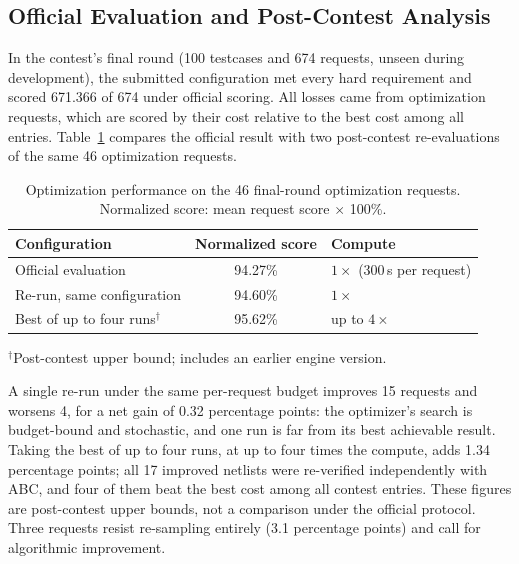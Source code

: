 \documentclass[conference,letterpaper]{IEEEtran}
\begin{document}
\subsection{Official Evaluation and Post-Contest Analysis}
\label{sec:official}

In the contest's final round (100 testcases and 674 requests, unseen during
development), the submitted configuration met every hard requirement and
scored 671.366 of 674 under official scoring. All losses came from
optimization requests, which are scored by their cost relative to the best
cost among all entries. Table~\ref{tab:official} compares the official result
with two post-contest re-evaluations of the same 46 optimization requests.

\begin{table}[t]
\caption{Optimization performance on the 46 final-round optimization requests.
Normalized score: mean request score $\times$ 100\%.}
\label{tab:official}
\centering
\footnotesize
\setlength{\tabcolsep}{3pt}
\begin{tabularx}{\columnwidth}{@{}lc>{\raggedright\arraybackslash}X@{}}
\toprule
Configuration & Normalized score & Compute \\
\midrule
Official evaluation & 94.27\% & $1\times$ (300\,s per request) \\
Re-run, same configuration & 94.60\% & $1\times$ \\
Best of up to four runs$^\dagger$ & 95.62\% & up to $4\times$ \\
\bottomrule
\end{tabularx}

\vspace{2pt}
\parbox{\columnwidth}{\footnotesize $^\dagger$Post-contest upper bound;
includes an earlier engine version.}
\end{table}

A single re-run under the same per-request budget improves 15 requests and
worsens 4, for a net gain of 0.32 percentage points: the optimizer's search is budget-bound and
stochastic, and one run is far from its best achievable result. Taking the
best of up to four runs, at up to four times the compute, adds 1.34
percentage points; all 17
improved netlists were re-verified independently with ABC, and four of them
beat the best cost among all contest entries. These figures are post-contest
upper bounds, not a comparison under the official protocol. Three requests
resist re-sampling entirely (3.1 percentage points) and call for algorithmic
improvement.
\end{document}
